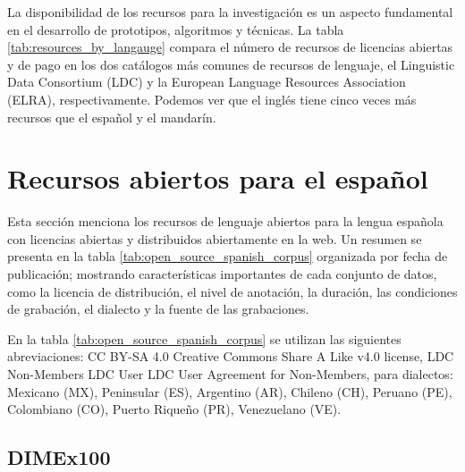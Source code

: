 La disponibilidad de los recursos para la investigación es un aspecto fundamental en el desarrollo de prototipos, algoritmos y técnicas. La tabla \ref{tab:resources_by_langauge} compara el n\'umero de recursos de licencias abiertas y de pago en los dos catálogos más comunes de recursos de lenguaje, el Linguistic Data Consortium (LDC) y la European Language Resources Association (ELRA), respectivamente. Podemos ver que el inglés tiene cinco veces más recursos que el español y el mandarín.





\section{Recursos abiertos para el español}

Esta sección menciona los recursos de lenguaje abiertos para la lengua española con licencias abiertas y distribuidos abiertamente en la web. Un resumen se presenta en la tabla \ref{tab:open_source_spanish_corpus} organizada por fecha de publicación; mostrando características importantes de cada conjunto de datos, como la licencia de distribución, el nivel de anotación, la duración, las condiciones de grabación, el dialecto y la fuente de las grabaciones.

En la tabla \ref{tab:open_source_spanish_corpus} se utilizan las siguientes abreviaciones:  CC BY-SA 4.0 Creative Commons Share A Like v4.0 license, LDC Non-Members LDC User LDC User Agreement for Non-Members, para dialectos: Mexicano (MX), Peninsular (ES), Argentino (AR), Chileno (CH), Peruano (PE), Colombiano (CO), Puerto Riqueño (PR), Venezuelano (VE). 



\subsection{DIMEx100}

